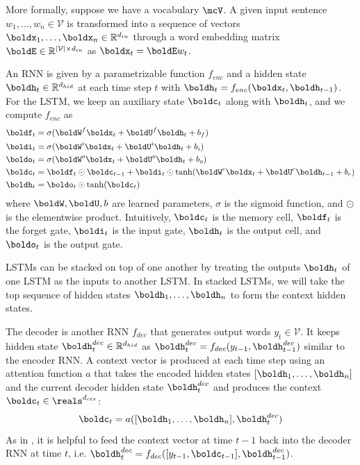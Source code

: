 \documentclass[12pt]{report}
\begin{document}
More formally, suppose we have a vocabulary $\mcV$. A given input sentence $w_1, \ldots, w_n \in \mathcal{V}$ is transformed into a sequence of vectors $\boldx_1, \ldots, \boldx_n \in \mathbb{R}^{d_{in}}$ through a word embedding matrix $\boldE \in \mathbb{R}^{|\mathcal{V}| \times d_{in}}$ as $\boldx_t = \boldE w_t$.

An RNN is given by a parametrizable function $f_{enc}$ and a hidden state $\boldh_t \in \mathbb{R}^{ d_{hid}}$ at each time step $t$ with $\boldh_t = f_{enc}(\boldx_t, \boldh_{t-1})$. For the LSTM, we keep an auxiliary state $\boldc_t$ along with $\boldh_t$, and we compute $f_{enc}$ as
\begin{align}
\boldf_t &= \sigma(\boldW^f \boldx_t + \boldU^f \boldh_t + b_f) \\
\boldi_t &= \sigma(\boldW^i \boldx_t + \boldU^i \boldh_t + b_i) \\
\boldo_t &= \sigma(\boldW^o \boldx_t + \boldU^o \boldh_t + b_o) \\
\boldc_t &= \boldf_t \odot \boldc_{t-1}  + \boldi_t \odot \tanh(\boldW^c \boldx_t + \boldU^c \boldh_{t-1} + b_c) \\
\boldh_t &= \boldo_t \odot \tanh(\boldc_t)
\end{align}
where $\boldW, \boldU, b$ are learned parameters, $\sigma$ is the sigmoid function, and $\odot$ is the elementwise product. 
Intuitively, $\boldc_t$ is the memory cell, $\boldf_t$ is the forget gate, $\boldi_t$ is the input gate, $\boldh_t$ is the output cell, and $\boldo_t$ is the output gate.

LSTMs can be stacked on top of one another by treating the outputs $\boldh_t$ of one LSTM as the inputs to another LSTM. In stacked LSTMs, we will take the top sequence of hidden states $\boldh_1, \ldots, \boldh_n$ to form the context hidden states.


The decoder is another RNN $f_{dec}$ that generates output words $y_t \in \mathcal{V}$. It keeps hidden state $\boldh_t^{dec} \in \mathbb{R}^{d_{hid}}$ as $\boldh_t^{dec} = f_{dec}(y_{t-1}, \boldh_{t-1}^{dec})$ similar to the encoder RNN.
A context vector is produced at each time step using an attention function $a$ that takes the encoded hidden states $[\boldh_1, \ldots, \boldh_n]$ and the current decoder hidden state $\boldh_t^{dec}$ and produces the context $\boldc_t \in \reals^{d_{ctx}}$:
\begin{equation}
\boldc_t = a([\boldh_1, \ldots, \boldh_n], \boldh_t^{dec})
\end{equation}
As in \citet{luong2015effective}, it is helpful to feed the context vector at time $t-1$ back into the decoder RNN at time $t$, i.e. $\boldh_t^{dec} = f_{dec}([y_{t-1}, \boldc_{t-1}], \boldh_{t-1}^{dec})$.
\end{document}
